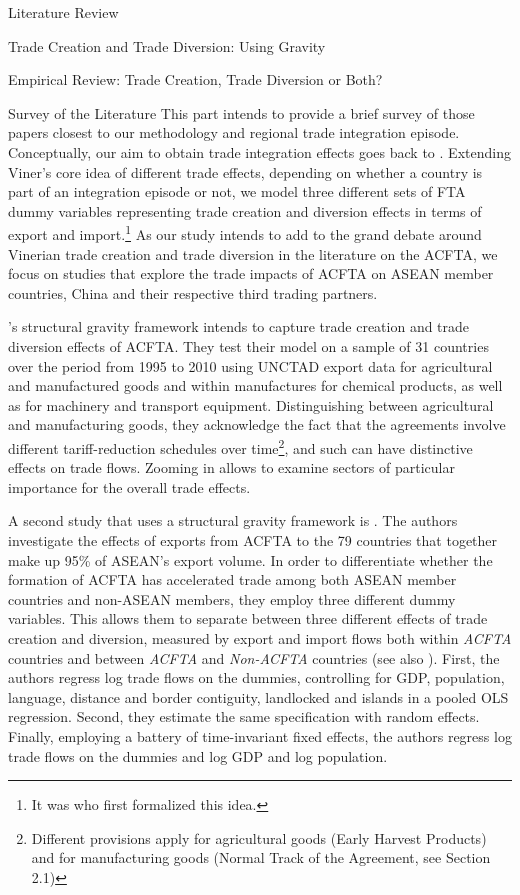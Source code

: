 \begin{section}{Literature Review}
\begin{subsection}{Trade Creation and Trade Diversion: Using Gravity}
\begin{subsection}{Empirical Review: Trade Creation, Trade Diversion or Both?}
\begin{subsubsection}{Survey of the Literature}
This part intends to provide a brief survey of those papers closest to our methodology and regional trade integration episode. Conceptually, our aim to obtain trade integration effects goes back to \cite{viner1950}. Extending Viner's core idea of different trade effects, depending on whether a country is part of an integration episode or not, we model three different sets of FTA dummy variables representing trade creation and diversion effects in terms of export and import.\footnote{It was \cite{endoh1999} who first formalized this idea.} As our study intends to add to the grand debate around Vinerian trade creation and trade diversion in the literature on the ACFTA, we focus on studies that explore the trade impacts of ACFTA on ASEAN member countries, China and their respective third trading partners. 

\cite{smz2014}'s structural gravity framework intends to capture trade creation and trade diversion effects of ACFTA. They test their model on a sample of 31 countries over the period from 1995 to 2010 using UNCTAD export data for agricultural and manufactured goods and within manufactures for chemical products, as well as for machinery and transport equipment. Distinguishing between agricultural and manufacturing goods, they acknowledge the fact that the agreements involve different tariff-reduction schedules over time\footnote{Different provisions apply for agricultural goods (Early Harvest Products) and for manufacturing goods (Normal Track of the Agreement, see Section 2.1)}, and such can have distinctive effects on trade flows. Zooming in allows to examine sectors of particular importance for the overall trade effects.

A second study that uses a structural gravity framework is \cite{wla_2021}. The authors investigate the effects of exports from ACFTA to the 79 countries that together make up 95\% of ASEAN's export volume. In order to differentiate whether the formation of ACFTA has accelerated trade among both ASEAN member countries and non-ASEAN members, they employ three different dummy variables.  This allows them to separate between three different effects of trade creation and diversion, measured by export and import flows both within \textit{ACFTA} countries and between \textit{ACFTA} and \textit{Non-ACFTA} countries (see also \cite{carrere_2006}). First, the authors regress log trade flows on the dummies, controlling for GDP, population, language, distance and border contiguity, landlocked and islands in a pooled OLS regression. Second, they estimate the same specification with random effects. Finally, employing a battery of time-invariant fixed effects, the authors regress log trade flows on the dummies and log GDP and log population. 


\end{subsubsection}
\end{subsection}
\end{subsection}
\end{section}
